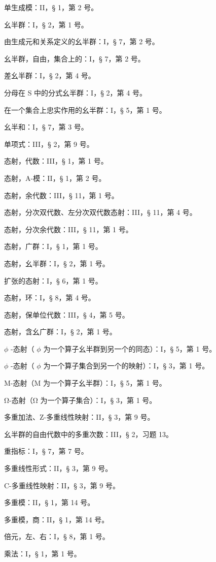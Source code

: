 单生成模：II，§ 1，第 2 号。

幺半群：I，§ 2，第 1 号。

由生成元和关系定义的幺半群：I，§ 7，第 2 号。

幺半群，自由，集合上的：I，§ 7，第 2 号。

差幺半群：I，§ 2，第 4 号。

分母在 S 中的分式幺半群：I，§ 2，第 4 号。

在一个集合上忠实作用的幺半群：I，§ 5，第 1 号。

幺半和：I，§ 7，第 3 号。

单项式：III，§ 2，第 9 号。

态射，代数：III，§ 1，第 1 号。

态射，A-模：II，§ 1，第 2 号。

态射，余代数：III，§ 11，第 1 号。

态射，分次双代数、左分次双代数态射：III，§ 11，第 4 号。

态射，分次余代数：III，§ 11，第 1 号。

态射，广群：I，§ 1，第 1 号。

态射，幺半群：I，§ 2，第 1 号。

扩张的态射：I，§ 6，第 1 号。

态射，环：I，§ 8，第 4 号。

态射，保单位代数：III，§ 4，第 5 号。

态射，含幺广群：I，§ 2，第 1 号。

\(\phi\) -态射（ \(\phi\) 为一个算子幺半群到另一个的同态）：I，§ 5，第 1 号。

\(\phi\) -态射（ \(\phi\) 为一个算子集合到另一个的映射）：I，§ 3，第 1 号。

M-态射（M 为一个算子幺半群）：I，§ 5，第 1 号。

Ω-态射（Ω 为一个算子集合）：I，§ 3，第 1 号。

多重加法、Z-多重线性映射：II，§ 3，第 9 号。

幺半群的自由代数中的多重次数：III，§ 2，习题 13。

重指标：I，§ 7，第 7 号。

多重线性形式：II，§ 3，第 9 号。

C-多重线性映射：II，§ 3，第 9 号。

多重模：II，§ 1，第 14 号。

多重模，商：II，§ 1，第 14 号。

倍元，左、右：I，§ 8，第 1 号。

乘法：I，§ 1，第 1 号。

